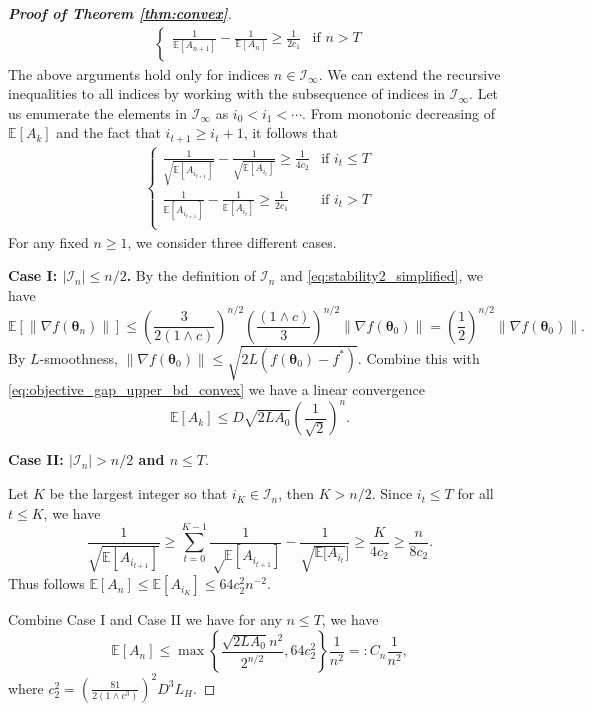 \documentclass[11pt]{amsart}
\theoremstyle{plain}
\theoremstyle{definition}
\theoremstyle{remark}
\def\E{\mathbb{E}}
\def\param{\boldsymbol{\theta}}
\newcommand{\commHL}[1]{{\textcolor{blue}{#1}}}
\begin{document}
\begin{proof}[\textbf{Proof of Theorem \ref{thm:convex}}]
\begin{align*}
\begin{cases}
        \displaystyle\frac{1}{\E[A_{n+1}]}-\frac{1}{\E[A_n]}\geq \frac{1}{2c_1} & \text{if } n> T\\
    \end{cases}
    \end{align*}
    The above arguments hold only for indices $n\in \mathcal{I}_{\infty}$. We can extend the recursive inequalities to all indices by working with the subsequence of indices in $\mathcal{I}_{\infty}$. Let us enumerate the elements in $\mathcal{I}_{\infty}$ as $i_{0}<i_{1}<\cdots$. From monotonic decreasing of $\E[A_k]$ and the fact that $i_{t+1}\geq i_{t}+1$, it follows that
    \begin{align*}
    \begin{cases}
        \displaystyle\frac{1}{\sqrt{\E[A_{i_{t+1}}]}}-\frac{1}{\sqrt{\E[A_{i_t}]}}\geq \frac{1}{4c_2} & \text{if } i_t\leq T\\
        \displaystyle\frac{1}{\E[A_{i_{t+1}}]}-\frac{1}{\E[A_{i_t}]}\geq \frac{1}{2c_1} & \text{if } i_t> T\\
    \end{cases}
    \end{align*}
    For any fixed $n\geq 1$, we consider three different cases.

    \textbf{Case I: $|\mathcal{I}_n|\leq n/2$.} By the definition of $\mathcal{I}_n$ and \eqref{eq:stability2_simplified}, we have
    \[
   \E[\|\nabla f(\param_n)\|]\leq \left(\frac{3}{2(1\wedge c)}\right)^{n/2}\left(\frac{(1\wedge c)}{3}\right)^{n/2}\|\nabla f(\param_0)\|=\left(\frac{1}{2}\right)^{n/2}\|\nabla f(\param_0)\|.
    \]
    By $L$-smoothness, $\| \nabla f(\param_{0}) \| \le \sqrt{2L (f(\param_{0})-f^{*}) }.$ Combine this with \eqref{eq:objective_gap_upper_bd_convex} we have a linear convergence
    \[
    \E[A_{k}]\leq D\sqrt{2LA_0}\left(\frac{1}{\sqrt{2}}\right)^n. %
    \]  
    
    \textbf{Case II: $|\mathcal{I}_n|>n/2$ and $n\leq T$}.
    
    Let $K$ be the largest integer so that $i_{K}\in \mathcal{I}_n$, then $K>n/2.$ Since $i_t\leq T$ for all $t\leq K$, we have
    \[
    \frac{1}{\sqrt{\E[A_{i_{t+1}}]}}\geq \sum_{t=0}^{K-1}\frac{1}{{\sqrt\E[A_{i_{t+1}}]}}-\frac{1}{\sqrt{\E[A_{i_{t}}}]}\geq \frac{K}{4c_2}\geq \frac{n}{8c_2}.
    \]
    Thus follows $\E[A_n]\leq \E[A_{i_K}] \le 64c_{2}^{2}n^{-2}$. 

    Combine Case I and Case II we have for any $n\leq T$, we have
    \[
    \E[A_n]\leq \max\left\{\frac{\sqrt{2LA_0}n^2}{2^{n/2}},64c_2^2\right\}\frac{1}{n^2}=:C_n\frac{1}{n^2},
    \]
    where $c_2^2=\left(\frac{81}{2(1\wedge c^3)}\right)^2D^3L_H.$


\end{proof}
\end{document}
